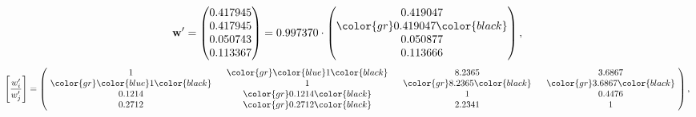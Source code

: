\begin{example}
\begin{equation*}
\mathbf{w}^{\prime} =
\begin{pmatrix}
0.417945\\
0.417945\\
0.050743\\
0.113367
\end{pmatrix} =
0.997370\cdot
\begin{pmatrix}
0.419047\\
\color{gr} 0.419047\color{black} \\
0.050877\\
0.113666
\end{pmatrix},
\end{equation*}
\begin{equation*}
\left[ \frac{{w}^{\prime}_i}{{w}^{\prime}_j} \right] =
\begin{pmatrix}
$\,\,$ 1 $\,\,$ & $\,\,$\color{gr} \color{blue} 1\color{black} $\,\,$ & $\,\,$8.2365$\,\,$ & $\,\,$3.6867$\,\,$ \\
$\,\,$\color{gr} \color{blue} 1\color{black} $\,\,$ & $\,\,$ 1 $\,\,$ & $\,\,$\color{gr} 8.2365\color{black} $\,\,$ & $\,\,$\color{gr} 3.6867\color{black}   $\,\,$ \\
$\,\,$0.1214$\,\,$ & $\,\,$\color{gr} 0.1214\color{black} $\,\,$ & $\,\,$ 1 $\,\,$ & $\,\,$0.4476 $\,\,$ \\
$\,\,$0.2712$\,\,$ & $\,\,$\color{gr} 0.2712\color{black} $\,\,$ & $\,\,$2.2341$\,\,$ & $\,\,$ 1  $\,\,$ \\
\end{pmatrix},
\end{equation*}
\end{example}
\newpage
